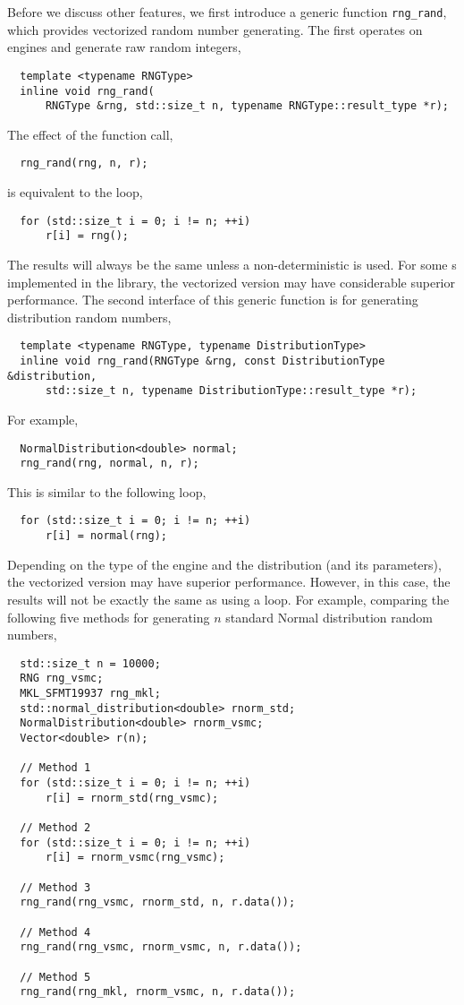 Before we discuss other features, we first introduce a generic function
\verb|rng_rand|, which provides vectorized random number generating. The first
operates on \rng engines and generate raw random integers,
\begin{Verbatim}
  template <typename RNGType>
  inline void rng_rand(
      RNGType &rng, std::size_t n, typename RNGType::result_type *r);
\end{Verbatim}
The effect of the function call,
\begin{Verbatim}
  rng_rand(rng, n, r);
\end{Verbatim}
is equivalent to the loop,
\begin{Verbatim}
  for (std::size_t i = 0; i != n; ++i)
      r[i] = rng();
\end{Verbatim}
The results will always be the same unless a non-deterministic \rng is used.
For some \rng{}s implemented in the library, the vectorized version may have
considerable superior performance. The second interface of this generic
function is for generating distribution random numbers,
\begin{Verbatim}
  template <typename RNGType, typename DistributionType>
  inline void rng_rand(RNGType &rng, const DistributionType &distribution,
      std::size_t n, typename DistributionType::result_type *r);
\end{Verbatim}
For example,
\begin{Verbatim}
  NormalDistribution<double> normal;
  rng_rand(rng, normal, n, r);
\end{Verbatim}
This is similar to the following loop,
\begin{Verbatim}
  for (std::size_t i = 0; i != n; ++i)
      r[i] = normal(rng);
\end{Verbatim}
Depending on the type of the \rng engine and the distribution (and its
parameters), the vectorized version may have superior performance. However, in
this case, the results will not be exactly the same as using a loop. For
example, comparing the following five methods for generating $n$ standard
Normal distribution random numbers,
\begin{Verbatim}
  std::size_t n = 10000;
  RNG rng_vsmc;
  MKL_SFMT19937 rng_mkl;
  std::normal_distribution<double> rnorm_std;
  NormalDistribution<double> rnorm_vsmc;
  Vector<double> r(n);

  // Method 1
  for (std::size_t i = 0; i != n; ++i)
      r[i] = rnorm_std(rng_vsmc);

  // Method 2
  for (std::size_t i = 0; i != n; ++i)
      r[i] = rnorm_vsmc(rng_vsmc);

  // Method 3
  rng_rand(rng_vsmc, rnorm_std, n, r.data());

  // Method 4
  rng_rand(rng_vsmc, rnorm_vsmc, n, r.data());

  // Method 5
  rng_rand(rng_mkl, rnorm_vsmc, n, r.data());
\end{Verbatim}
